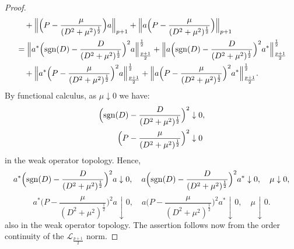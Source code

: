 \begin{proof}
\begin{align*}
                                        &\quad + \Big\|\Big(P-\frac{\mu}{(D^2+\mu^2)^{\frac12}}\Big)a\Big\|_{p+1}+\Big\|a\Big(P-\frac{\mu}{(D^2+\mu^2)^{\frac12}}\Big)\Big\|_{p+1}\\
                                        &= \Big\|a^*\Big({\rm sgn}(D)-\frac{D}{(D^2+\mu^2)^{\frac12}}\Big)^2a\Big\|_{\frac{p+1}{2}}^{\frac12}+\Big\|a\Big({\rm sgn}(D)-\frac{D}{(D^2+\mu^2)^{\frac12}}\Big)^2a^*\Big\|_{\frac{p+1}{2}}^{\frac12}\\
                                        &\quad + \Big\|a^*\Big(P-\frac{\mu}{(D^2+\mu^2)^{\frac12}}\Big)^2a\Big\|_{\frac{p+1}{2}}^{\frac12}+\Big\|a\Big(P-\frac{\mu}{(D^2+\mu^2)^{\frac12}}\Big)^2a^*\Big\|_{\frac{p+1}{2}}^{\frac12}.
    \end{align*}
    By functional calculus, as $\mu\downarrow  0$ we have:
    \begin{align*}
        \Big({\rm sgn}(D)-\frac{D}{(D^2+\mu^2)^{\frac12}}\Big)^2 &\downarrow 0,\\
                 \Big(P-\frac{\mu}{(D^2+\mu^2)^{\frac12}}\Big)^2 &\downarrow 0
    \end{align*}
    in the weak operator topology.
    Hence,
    $$a^*\Big({\rm sgn}(D)-\frac{D}{(D^2+\mu^2)^{\frac12}}\Big)^2a\downarrow 0,\quad a\Big({\rm sgn}(D)-\frac{D}{(D^2+\mu^2)^{\frac12}}\Big)^2a^*\downarrow 0,\quad\mu\downarrow0,$$
    $$a^*\Big(P-\frac{\mu}{(D^2+\mu^2)^{\frac12}}\Big)^2a\downarrow 0,\quad a\Big(P-\frac{\mu}{(D^2+\mu^2)^{\frac12}}\Big)^2a^*\downarrow0,\quad\mu\downarrow0.$$
    also in the weak operator topology.
    The assertion follows now from the order continuity of the $\mathcal{L}_{\frac{p+1}{2}}$ norm.
    \end{proof}


